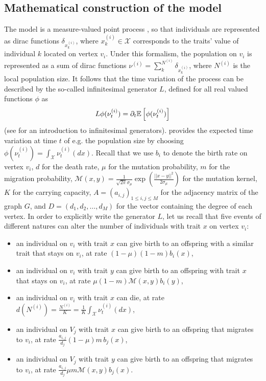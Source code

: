     \subsection{Mathematical construction of the model}\label{secSI:formal_descrip}
    The model is a measure-valued point process \cite{Bansaye2015}, so that individuals are represented as dirac functions $\delta_{x_{k}^{(i)}}$, where $x_{k}^{(i)} \in \mathcal{X}$ corresponds to the traits' value of individual $k$ located on vertex $v_i$.
    Under this formalism, the population on $v_i$ is represented as a sum of dirac functions $\nu^{(i)} = \sum^{N^{(i)}}_k \delta_{x_{k}^{(i)}}$, where $N^{(i)}$ is the local population size. 
    It follows that the time variation of the process can be described by the so-called infinitesimal generator $L$, defined for all real valued functions $\phi$ as
    \begin{equation}\label{eqSI:def_infgen}
         L \phi(\nu^{(i)}_t) = \partial_t {\mathbb{E}} \left[\phi(\nu^{(i)}_t) \right]
    \end{equation}
    (see \cite{Linke2015} for an introduction to infinitesimal generators).  provides the expected time variation at time $t$ of e.g. the population size by choosing $\phi(\nu^{(i)}_t) = \int_\mathcal{X} \nu^{(i)}_t(dx)$.
    Recall that we use
    $b_i$ to denote the birth rate on vertex $v_i$,
    $d$ for the death rate,
    $\mu$ for the mutation probability,
    $m$ for the migration probability,
    $\mathcal{M}(x,y) = \frac{1}{\sqrt{2\pi}\sigma_\mu} \exp \left(\frac{||x-y||^2}{2\sigma_\mu} \right)$ for the mutation kernel,
    $K$ for the carrying capacity,
    $A = (a_{i,j})_{1\leq i, j \leq M}$ for the adjacency matrix of the graph $G$, and
    $D = (d_1,d_2,\dots,d_M)$ for the vector containing the degree of each vertex.
    In order to explicitly write the generator $L$,
    let us recall that five events of different natures can alter the number of individuals with trait $x$ on vertex $v_i$:
    \begin{itemize}
        \item an individual on $v_i$ with trait $x$ can give birth to an offspring with a similar trait that stays on $v_i$, at rate $(1 - \mu ) (1 - m) b_i(x)$,
        \item an individual on $v_i$ with trait $y$ can give birth to an offspring with trait $x$ that stays on $v_i$, at rate $\mu (1-m) \mathcal{M}(x,y) b_i(y)$,
        \item an individual on $v_i$ with trait $x$ can die, at rate $d(N^{(i)}) = \frac{N^{(i)}}{K} = \frac{1}{K} \int_\mathcal{X} \nu_t^{(i)} (dx)$,
        \item an individual on $V_j$ with trait $x$ can give birth to an offspring that migrates to $v_i$, at rate $ \frac{a_{i,j}}{d_j} (1 - \mu ) m \, b_j(x)$,
        \item an individual on $V_j$ with trait $y$ can give birth to an offspring that migrates to $v_i$, at rate $ \frac{a_{i,j}}{d_j} \mu  m \mathcal{M}(x,y) b_j(x)$.
    \end{itemize}
